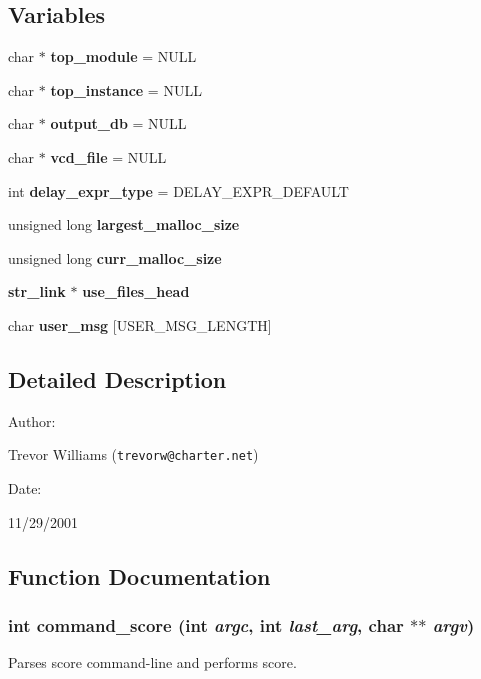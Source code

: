 \subsection*{Variables}
\begin{CompactItemize}
\item 
char $\ast$ {\bf top\_\-module} = NULL
\item 
char $\ast$ {\bf top\_\-instance} = NULL
\item 
char $\ast$ {\bf output\_\-db} = NULL
\item 
char $\ast$ {\bf vcd\_\-file} = NULL
\item 
int {\bf delay\_\-expr\_\-type} = DELAY\_\-EXPR\_\-DEFAULT
\item 
unsigned long {\bf largest\_\-malloc\_\-size}
\item 
unsigned long {\bf curr\_\-malloc\_\-size}
\item 
{\bf str\_\-link} $\ast$ {\bf use\_\-files\_\-head}
\item 
char {\bf user\_\-msg} [USER\_\-MSG\_\-LENGTH]
\end{CompactItemize}


\subsection{Detailed Description}


\begin{Desc}
\item[Author: ]\par
Trevor Williams ({\tt trevorw@charter.net}) \end{Desc}
\begin{Desc}
\item[Date: ]\par
11/29/2001\end{Desc}


\subsection{Function Documentation}
\subsubsection{\setlength{\rightskip}{0pt plus 5cm}int command\_\-score (int {\em argc}, int {\em last\_\-arg}, char $\ast$$\ast$ {\em argv})}\label{score_8c_a13}


Parses score command-line and performs score.

